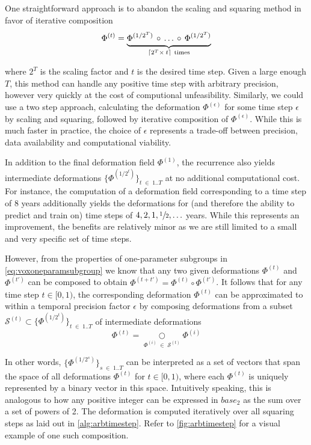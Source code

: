 One straightforward approach is to abandon the scaling and squaring method in favor of iterative composition
\begin{equation}
	\Phi^{(t)} =
	\underbrace{
		\Phi^{(1 / 2^T)} \, \circ \, \ldots \, \circ \, \Phi^{(1 / 2^T)} \vphantom{\Phi^{(1 / 2^T)}_2}
	}_{\lceil 2^T \times \: t \rceil \ \text{times}}
\end{equation}

where $2^T$ is the scaling factor and $t$ is the desired time step. Given a large enough $T$, this method can handle any positive time step with arbitrary precision, however very quickly at the cost of computional unfeasibility. Similarly, we could use a two step approach, calculating the deformation $\Phi^{(\epsilon)}$ for some time step $\epsilon$ by scaling and squaring, followed by iterative composition of $\Phi^{(\epsilon)}$. While this is much faster in practice, the choice of $\epsilon$ represents a trade-off between precision, data availability and computational viability.

In addition to the final deformation field $\Phi^{(1)}$, the recurrence also yields intermediate deformations $\{ \Phi^{(1 / 2^{t})} \}_{t \; \in \; 1 .. T} $ at no additional computational cost. For instance, the computation of a deformation field corresponding to a time step of 8 years additionally yields the deformations for (and therefore the ability to predict and train on) time steps of ${ 4, 2, 1, \sfrac{1}{2}, \ldots }$ years. While this represents an improvement, the benefits are relatively minor as we are still limited to a small and very specific set of time steps.

However, from the properties of one-parameter subgroups in \autoref{eq:voxoneparamsubgroup} we know that any two given deformations $\Phi^{(t)}$ and $\Phi^{(t')}$ can be composed to obtain ${ \Phi^{(t + t')} = \Phi^{(t)} \circ \Phi^{(t')} }$. It follows that for any time step $t \in [0, 1)$, the corresponding deformation $\Phi^{(t)}$ can be approximated to within a temporal precision factor $\epsilon$ by composing deformations from a subset $\mathcal{S}^{(t)} \subset \{ \Phi^{(1 / 2^{t})} \}_{t \; \in \; 1 .. T} $ of intermediate deformations
\begin{equation}
	\Phi^{(t)} = \underset{\Phi^{(i)} \; \in \; \mathcal{S}^{(t)}}{\bigcirc} \Phi^{(i)}
\end{equation}

In other words, $\{ \Phi^{(1 / 2^{s})} \}_{s \; \in \; 1 .. T}$ can be interpreted as a set of vectors that span the space of all deformations $\Phi^{(t)}$ for $t \in [0, 1)$, where each $\Phi^{(t)}$ is uniquely represented by a binary vector in this space. Intuitively speaking, this is analogous to how any positive integer can be expressed in $base_2$ as the sum over a set of powers of 2. The deformation is computed iteratively over all squaring steps as laid out in \autoref{alg:arbtimestep}. Refer to \autoref{fig:arbtimestep} for a visual example of one such composition.

